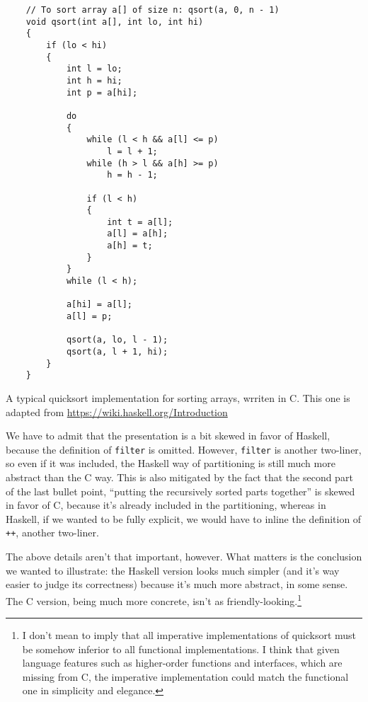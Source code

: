 \documentclass[declaration,mgr,english,shortabstract]{iithesis}
\newcommand{\m}[1]{\texttt{#1}}
\begin{document}
\begin{listing}[H]
    \begin{verbatim}
    // To sort array a[] of size n: qsort(a, 0, n - 1)
    void qsort(int a[], int lo, int hi) 
    {
        if (lo < hi)
        {
            int l = lo;
            int h = hi;
            int p = a[hi];

            do
            {
                while (l < h && a[l] <= p) 
                    l = l + 1;
                while (h > l && a[h] >= p)
                    h = h - 1;
                
                if (l < h)
                {
                    int t = a[l];
                    a[l] = a[h];
                    a[h] = t;
                }
            }
            while (l < h);

            a[hi] = a[l];
            a[l] = p;

            qsort(a, lo, l - 1);
            qsort(a, l + 1, hi);
        }
    }
    \end{verbatim}
    \caption{A typical quicksort implementation for sorting arrays, wrriten in C. This one is adapted from \url{https://wiki.haskell.org/Introduction}}
    \label{CQuicksort}
\end{listing}

We have to admit that the presentation is a bit skewed in favor of Haskell, because the definition of \m{filter} is omitted. However, \m{filter} is another two-liner, so even if it was included, the Haskell way of partitioning is still much more abstract than the C way. This is also mitigated by the fact that the second part of the last bullet point, ``putting the recursively sorted parts together'' is skewed in favor of C, because it's already included in the partitioning, whereas in Haskell, if we wanted to be fully explicit, we would have to inline the definition of \m{++}, another two-liner.

The above details aren't that important, however. What matters is the conclusion we wanted to illustrate: the Haskell version looks much simpler (and it's way easier to judge its correctness) because it's much more abstract, in some sense. The C version, being much more concrete, isn't as friendly-looking.\footnote{I don't mean to imply that all imperative implementations of quicksort must be somehow inferior to all functional implementations. I think that given language features such as higher-order functions and interfaces, which are missing from C, the imperative implementation could match the functional one in simplicity and elegance.}
\end{document}
